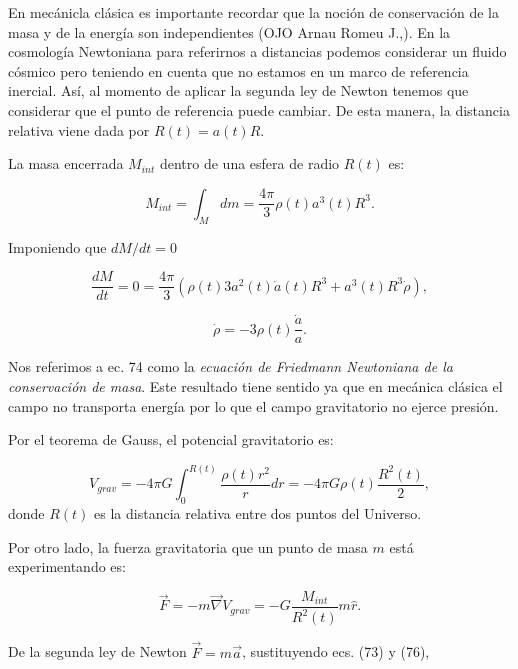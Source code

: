 \documentclass[11pt]{article}
\begin{document}
    En mecánicla clásica es importante recordar que la noción de conservación de la masa y de la energía son independientes (OJO {Arnau Romeu J.,)}. En la cosmología Newtoniana para referirnos a distancias podemos considerar un fluido cósmico pero teniendo en cuenta que no estamos en un marco de referencia inercial. Así, al momento de aplicar la segunda ley de Newton tenemos que considerar que el punto de referencia puede cambiar. De esta manera, la distancia relativa viene dada por $R(t) = a(t) R$.
    
    La masa  encerrada $M_{int}$ dentro de una esfera de radio $R(t)$ es: 
    
    \begin{equation}
        M_{int} = \int_M{dm} = \frac{4\pi}{3} \rho(t) a^3(t) R^3.
    \end{equation}
    
    Imponiendo que $dM/dt=0$
    
    \[
    \frac{dM}{dt}   = 0 =  \frac{4\pi}{3} \left( \rho(t)3 a^2(t) \dot{a}(t)  R^3 + a^3(t) R^3 \dot{\rho} \right), \]
    
    \begin{equation}
        \boxed{\dot{\rho} = -3 \rho(t) \frac{\dot{a}}{a}.}
    \end{equation}
     
    Nos referimos a ec. 74 como la {\textit{ecuación de Friedmann Newtoniana de la conservación de masa}}. Este resultado tiene sentido ya que en mecánica clásica el campo no transporta energía por lo que el campo gravitatorio no ejerce presión. 
    
    
    Por el teorema de Gauss, el potencial gravitatorio es: 
    
    \begin{equation}
        V_{grav} = -4 \pi G \int_0^{R(t)}{\frac{\rho(t)r^2}{r}dr} = -4 \pi G \rho(t) \frac{R^2(t)}{2},
    \end{equation}
    donde $R(t)$ es la distancia relativa entre dos puntos del Universo. 
    
    
    Por otro lado, la fuerza gravitatoria que un punto de masa $m$ está experimentando es: 
    
    \begin{equation}
        \vec{F} = -m \vec{\nabla} V_{grav} = - G \frac{M_{int}}{R^2(t)} m \hat{r}.
    \end{equation}
    
    De la segunda ley de Newton $\vec{F} = m \vec{a}$, sustituyendo ecs. (73) y (76),
    
\end{document}
